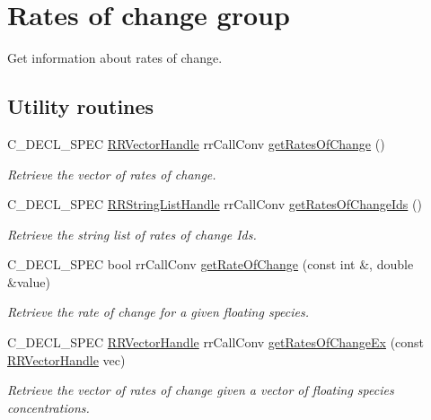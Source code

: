 \hypertarget{group__rate_of_change}{
\section{\-Rates of change group}
\label{group__rate_of_change}
}


\-Get information about rates of change.  


\subsection*{\-Utility routines}
\begin{DoxyCompactItemize}
\item 
\-C\-\_\-\-D\-E\-C\-L\-\_\-\-S\-P\-E\-C \hyperlink{rr__c__types_8h_aea46a16752b0ae2cd95c009030ee630e}{\-R\-R\-Vector\-Handle} \*
rr\-Call\-Conv \hyperlink{group__utility_gabbe129bee63761f7b0f98f060b86067b}{get\-Rates\-Of\-Change} ()
\begin{DoxyCompactList}\small\item\em \-Retrieve the vector of rates of change. \end{DoxyCompactList}\item 
\-C\-\_\-\-D\-E\-C\-L\-\_\-\-S\-P\-E\-C \hyperlink{rr__c__types_8h_abf561b014879247b7b92ee99c205de21}{\-R\-R\-String\-List\-Handle} \*
rr\-Call\-Conv \hyperlink{group__utility_ga9f0deef00dd16297d936c19c52167f51}{get\-Rates\-Of\-Change\-Ids} ()
\begin{DoxyCompactList}\small\item\em \-Retrieve the string list of rates of change \-Ids. \end{DoxyCompactList}\item 
\-C\-\_\-\-D\-E\-C\-L\-\_\-\-S\-P\-E\-C bool rr\-Call\-Conv \hyperlink{group__utility_gaad38321993112e230f7fccd96345de6c}{get\-Rate\-Of\-Change} (const int \&, double \&value)
\begin{DoxyCompactList}\small\item\em \-Retrieve the rate of change for a given floating species. \end{DoxyCompactList}\item 
\-C\-\_\-\-D\-E\-C\-L\-\_\-\-S\-P\-E\-C \hyperlink{rr__c__types_8h_aea46a16752b0ae2cd95c009030ee630e}{\-R\-R\-Vector\-Handle} \*
rr\-Call\-Conv \hyperlink{group__utility_gacfae48e32754e7678b8bb003df93ef53}{get\-Rates\-Of\-Change\-Ex} (const \hyperlink{rr__c__types_8h_aea46a16752b0ae2cd95c009030ee630e}{\-R\-R\-Vector\-Handle} vec)
\begin{DoxyCompactList}\small\item\em \-Retrieve the vector of rates of change given a vector of floating species concentrations. \end{DoxyCompactList}\end{DoxyCompactItemize}



